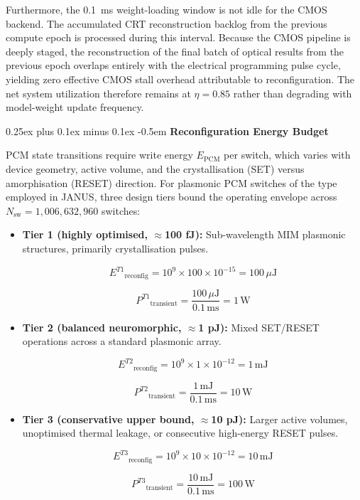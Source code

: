 \documentclass[journal]{IEEEtran}
\makeatletter
\newcommand{\subparagraph}{\@startsection{subparagraph}{5}{\parindent}%
  {0.25ex plus 0.1ex minus 0.1ex}%
  {-0.5em}%
  {\normalfont\normalsize\itshape}} %
\makeatother
\begin{document}
Furthermore, the 0.1~ms weight-loading window is not idle for the CMOS backend. The accumulated CRT reconstruction backlog from the previous compute epoch is processed during this interval. Because the CMOS pipeline is deeply staged, the reconstruction of the final batch of optical results from the previous epoch overlaps entirely with the electrical programming pulse cycle, yielding zero effective CMOS stall overhead attributable to reconfiguration. The net system utilization therefore remains at $\eta = 0.85$ rather than degrading with model-weight update frequency.

\subparagraph{\textbf{Reconfiguration Energy Budget}}

PCM state transitions require write energy $E_{\text{PCM}}$ per switch, which varies with device geometry, active volume, and the crystallisation (SET) versus amorphisation (RESET) direction. For plasmonic PCM switches of the type employed in JANUS, three design tiers bound the operating envelope across $N_{\text{sw}} = 1,006,632,960$ switches:

\begin{itemize}
\item \textbf{Tier 1 (highly optimised, $\approx$100 fJ):} Sub-wavelength MIM plasmonic structures, primarily crystallisation pulses.

\begin{equation}
{E^{T1}}_{\text{reconfig}} = 10^{9} \times 100 \times 10^{-15} = 100\,\mu\text{J}
\end{equation}

\begin{equation}
{P^{T1}}_{\text{transient}} = \frac{100\,\mu\text{J}}{0.1\,\text{ms}} = 1\,\text{W}
\end{equation}

\item \textbf{Tier 2 (balanced neuromorphic, $\approx$1 pJ):} Mixed SET/RESET operations across a standard plasmonic array.

\begin{equation}
{E^{T2}}_{\text{reconfig}} = 10^{9} \times 1 \times 10^{-12} = 1\,\text{mJ}
\end{equation}

\begin{equation}
{P^{T2}}_{\text{transient}} = \frac{1\,\text{mJ}}{0.1\,\text{ms}} = 10\,\text{W}
\end{equation}

\item \textbf{Tier 3 (conservative upper bound, $\approx$10 pJ):} Larger active volumes, unoptimised thermal leakage, or consecutive high-energy RESET pulses.

\begin{equation}
{E^{T3}}_{\text{reconfig}} = 10^{9} \times 10 \times 10^{-12} = 10\,\text{mJ}
\end{equation}

\begin{equation}
{P^{T3}}_{\text{transient}} = \frac{10\,\text{mJ}}{0.1\,\text{ms}} = 100\,\text{W}
\end{equation}
\end{itemize}
\end{document}
